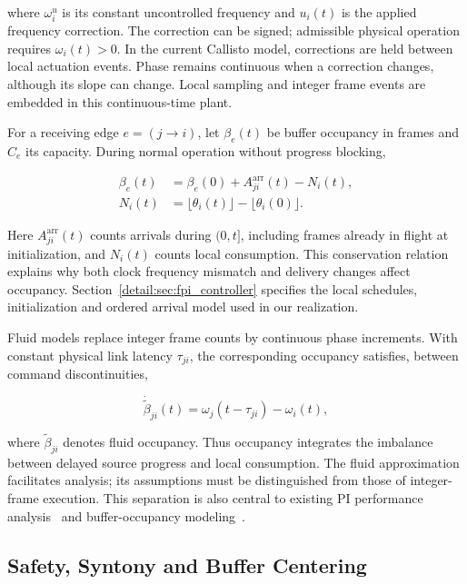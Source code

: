 where $\omega_i^u$ is its constant uncontrolled frequency and $u_i(t)$ is the applied frequency correction. The correction can be signed; admissible physical operation requires $\omega_i(t)>0$. In the current Callisto model, corrections are held between local actuation events. Phase remains continuous when a correction changes, although its slope can change. Local sampling and integer frame events are embedded in this continuous-time plant.

For a receiving edge $e=(j\to i)$, let $\beta_e(t)$ be buffer occupancy in frames and $C_e$ its capacity. During normal operation without progress blocking,

\begin{align}
\beta_e(t)&=\beta_e(0)+A_{ji}^{\mathrm{arr}}(t)-N_i(t),\nonumber\\
N_i(t)&=\lfloor\theta_i(t)\rfloor-\lfloor\theta_i(0)\rfloor.
\label{detail:eq:bg_count_balance}
\end{align}

Here $A_{ji}^{\mathrm{arr}}(t)$ counts arrivals during $(0,t]$, including frames already in flight at initialization, and $N_i(t)$ counts local consumption. This conservation relation explains why both clock frequency mismatch and delivery changes affect occupancy. Section~\ref{detail:sec:fpi_controller} specifies the local schedules, initialization and ordered arrival model used in our realization.

Fluid models replace integer frame counts by continuous phase increments. With constant physical link latency $\tau_{ji}$, the corresponding occupancy satisfies, between command discontinuities,

\begin{equation}
\dot{\widetilde\beta}_{ji}(t)
=\omega_j(t-\tau_{ji})-\omega_i(t),
\end{equation}

where $\widetilde\beta_{ji}$ denotes fluid occupancy. Thus occupancy integrates the imbalance between delayed source progress and local consumption. The fluid approximation facilitates analysis; its assumptions must be distinguished from those of integer-frame execution. This separation is also central to existing PI performance analysis~\cite{lall2022resistance} and buffer-occupancy modeling~\cite{lall2024bufferOccupancy}.

\subsection{Safety, Syntony and Buffer Centering}

